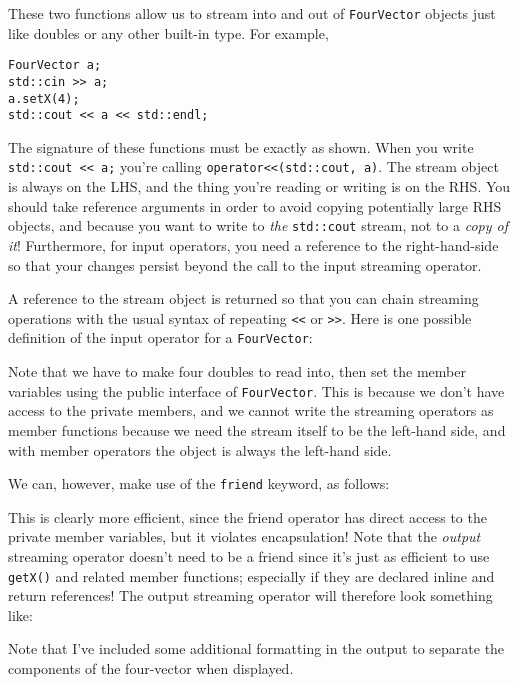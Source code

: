 \documentclass[a4paper]{scrartcl}
\begin{document}


These two functions allow us to stream into and out of \verb|FourVector| objects just like doubles or any other built-in type. For example,

\begin{verbatim}
FourVector a;
std::cin >> a;
a.setX(4);
std::cout << a << std::endl;
\end{verbatim}

The signature of these functions must be exactly as shown. When you write \newline \verb|std::cout << a;| you're calling \verb|operator<<(std::cout, a)|. The stream object is always on the LHS, and the thing you're reading or writing is on the RHS. You should take reference arguments in order to avoid copying potentially large RHS objects, and because you want to write to \emph{the} \verb|std::cout| stream, not to a \emph{copy of it}! Furthermore, for input operators, you need a reference to the right-hand-side so that your changes persist beyond the call to the input streaming operator.

A reference to the stream object is returned so that you can chain streaming operations with the usual syntax of repeating \verb|<<| or \verb|>>|. Here is one possible definition of the input operator for a \verb|FourVector|:



Note that we have to make four doubles to read into, then set the member variables using the public interface of \verb|FourVector|. This is because we don't have access to the private members, and we cannot write the streaming operators as member functions because we need the stream itself to be the left-hand side, and with member operators the object is always the left-hand side.

We can, however, make use of the \verb|friend| keyword, as follows:



This is clearly more efficient, since the friend operator has direct access to the private member variables, but it violates encapsulation! Note that the \emph{output} streaming operator doesn't need to be a friend since it's just as efficient to use \verb|getX()| and related member functions; especially if they are declared inline and return references! The output streaming operator will therefore look something like:



Note that I've included some additional formatting in the output to separate the components of the four-vector when displayed.


\end{document}
